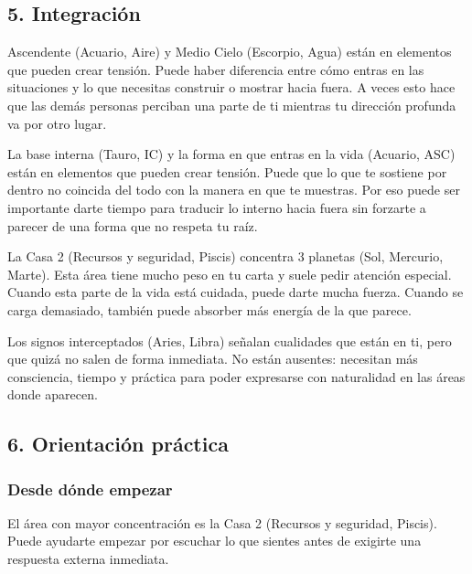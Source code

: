 \documentclass[11pt,a4paper]{article}
\begin{document}
\vspace{0.5cm}

\subsection{5. Integración}

Ascendente (Acuario, Aire) y Medio Cielo (Escorpio, Agua) están en elementos que pueden crear tensión. Puede haber diferencia entre cómo entras en las situaciones y lo que necesitas construir o mostrar hacia fuera. A veces esto hace que las demás personas perciban una parte de ti mientras tu dirección profunda va por otro lugar.

La base interna (Tauro, IC) y la forma en que entras en la vida (Acuario, ASC) están en elementos que pueden crear tensión. Puede que lo que te sostiene por dentro no coincida del todo con la manera en que te muestras. Por eso puede ser importante darte tiempo para traducir lo interno hacia fuera sin forzarte a parecer de una forma que no respeta tu raíz.

La Casa 2 (Recursos y seguridad, Piscis) concentra 3 planetas (Sol, Mercurio, Marte). Esta área tiene mucho peso en tu carta y suele pedir atención especial. Cuando esta parte de la vida está cuidada, puede darte mucha fuerza. Cuando se carga demasiado, también puede absorber más energía de la que parece.

Los signos interceptados (Aries, Libra) señalan cualidades que están en ti, pero que quizá no salen de forma inmediata. No están ausentes: necesitan más consciencia, tiempo y práctica para poder expresarse con naturalidad en las áreas donde aparecen.

\vspace{0.5cm}

\subsection{6. Orientación práctica}

\subsubsection*{Desde dónde empezar}
El área con mayor concentración es la Casa 2 (Recursos y seguridad, Piscis). Puede ayudarte empezar por escuchar lo que sientes antes de exigirte una respuesta externa inmediata.
\end{document}
